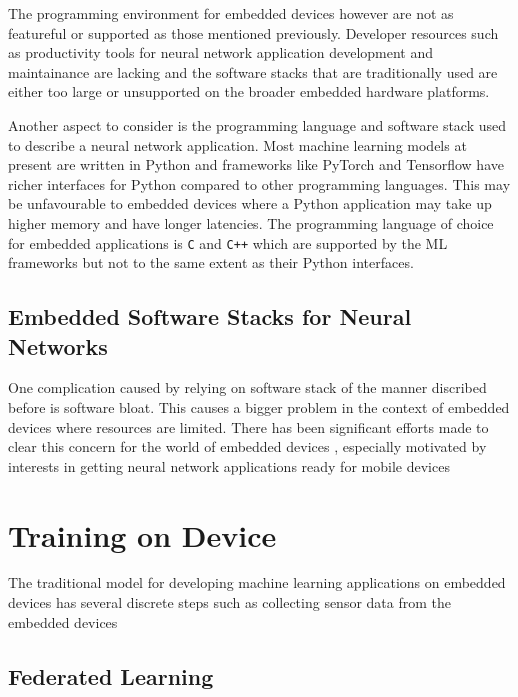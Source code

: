 
The programming environment for embedded devices however are not as featureful or supported as those mentioned previously. Developer resources such as productivity tools for neural network application development and maintainance are lacking and the software stacks that are traditionally used are either too large or unsupported on the broader embedded hardware platforms.

Another aspect to consider is the programming language and software stack used to describe a neural network application. Most machine learning models at present are written in Python and frameworks like PyTorch and Tensorflow have richer interfaces for Python compared to other programming languages. This may be unfavourable to embedded devices where a Python application may take up higher memory and have longer latencies. The programming language of choice for embedded applications is \texttt{C} and \texttt{C++} which are supported by the ML frameworks but not to the same extent as their Python interfaces.

\subsection{Embedded Software Stacks for Neural Networks}

One complication caused by relying on software stack of the manner discribed before is software bloat. This causes a bigger problem in the context of embedded devices where resources are limited. There has been significant efforts made to clear this concern for the world of embedded devices \cite{tinyml}, especially motivated by interests in getting neural network applications ready for mobile devices \cite{tfl} \cite{pytorch-mobile}

\section{Training on Device}

The traditional model for developing machine learning applications on embedded devices has several discrete steps such as collecting sensor data from the embedded devices

\subsection{Federated Learning}

